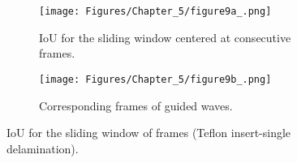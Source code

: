 \begin{figure} [!h]
	\begin{subfigure}[b]{1\textwidth}
		\centering
		\texttt{[image: Figures/Chapter\_5/figure9a\_.png]}
		\caption{IoU for the sliding window centered at consecutive frames.}
		\label{fig:CFRP_Teflon_3o_IoU_}
	\end{subfigure}
	\begin{subfigure}[b]{1\textwidth}
		\centering
		\texttt{[image: Figures/Chapter\_5/figure9b\_.png]}
		\caption{Corresponding frames of guided waves.} 
		\label{fig:CFRP_teflon_3o_shapes_}
	\end{subfigure}
	\caption{IoU for the sliding window of frames (Teflon insert-single delamination).}
	\label{fig:CFRP_Teflon_3o_IoU_centre_window}
\end{figure} 

